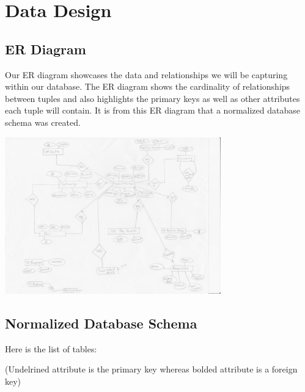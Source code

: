 \documentclass[11pt, titlepage]{article}
\begin{document}
\section{Data Design}

\subsection{ER Diagram}

Our ER diagram showcases the data and relationships we will be capturing within our database. The ER diagram shows the cardinality of relationships between tuples and also highlights the primary keys as well as other attributes each tuple will contain. It is from this ER diagram that a normalized database schema was created.

\includegraphics[width=0.7\textwidth, angle =270]{../design/er}

\subsection{Normalized Database Schema}

Here is the list of tables:

(Undelrined attribute is the primary key whereas bolded attribute is a foreign key)
\end{document}
